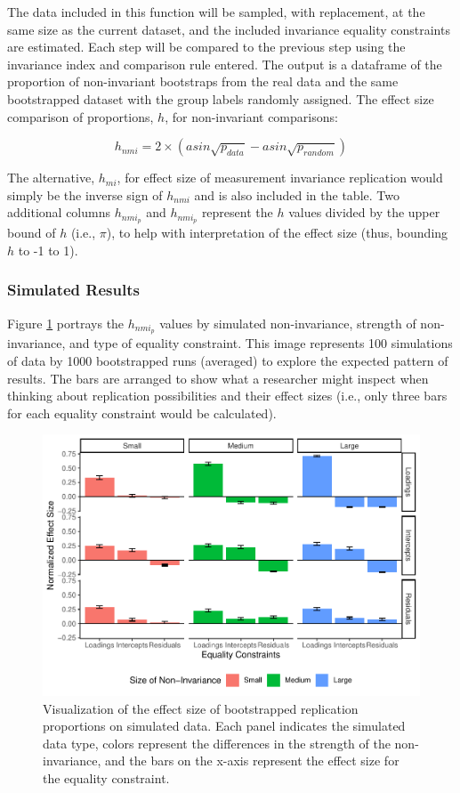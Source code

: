 \documentclass[
  man]{apa7}
\begin{document}
\normalsize

The data included in this function will be sampled, with replacement, at the same size as the current dataset, and the included invariance equality constraints are estimated. Each step will be compared to the previous step using the invariance index and comparison rule entered. The output is a dataframe of the proportion of non-invariant bootstraps from the real data and the same bootstrapped dataset with the group labels randomly assigned. The effect size comparison of proportions, \(h\), for non-invariant comparisons:

\[h_{nmi} = 2 \times (asin\sqrt{p_{data}} - asin\sqrt{p_{random}})\]

The alternative, \(h_{mi}\), for effect size of measurement invariance replication would simply be the inverse sign of \(h_{nmi}\) and is also included in the table. Two additional columns \(h_{nmi_p}\) and \(h_{nmi_p}\) represent the \(h\) values divided by the upper bound of \(h\) (i.e., \(\pi\)), to help with interpretation of the effect size (thus, bounding \(h\) to -1 to 1).

\hypertarget{simulated-results-1}{%
\subsubsection{Simulated Results}\label{simulated-results-1}}

Figure \ref{fig:boot-rr-pic} portrays the \(h_{nmi_p}\) values by simulated non-invariance, strength of non-invariance, and type of equality constraint. This image represents 100 simulations of data by 1000 bootstrapped runs (averaged) to explore the expected pattern of results. The bars are arranged to show what a researcher might inspect when thinking about replication possibilities and their effect sizes (i.e., only three bars for each equality constraint would be calculated).

\begin{figure}
\centering
\includegraphics{manuscript_files/figure-latex/boot-rr-pic-1.pdf}
\caption{\label{fig:boot-rr-pic}Visualization of the effect size of bootstrapped replication proportions on simulated data. Each panel indicates the simulated data type, colors represent the differences in the strength of the non-invariance, and the bars on the x-axis represent the effect size for the equality constraint.}
\end{figure}
\end{document}
